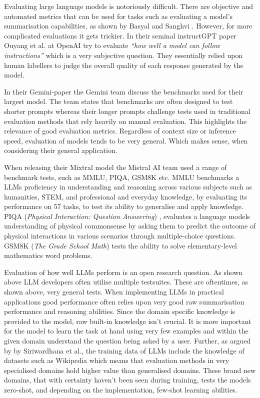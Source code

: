Evaluating large language models is notoriously difficult. There are objective and automated metrics that can be used for tasks such as evaluating a model's summarisation capabilities, as shown by Basyal and Sanghvi \cite{basyal_text_2023}. However, for more complicated evaluations it gets trickier. In their seminal instructGPT paper Ouyang et al. at OpenAI try to evaluate \textit{“how well a model can follow instructions”} \cite{ouyang_training_2022} which is a very subjective question. They essentially relied upon human labellers to judge the overall quality of each response generated by the model.


In their Gemini-paper the Gemini team discuss the benchmarks used for their largest model. The team states that benchmarks are often designed to test shorter prompts whereas their longer prompts challenge tests used in traditional evaluation methods that rely heavily on manual evaluation. This highlights the relevance of good evaluation metrics. Regardless of context size or inference speed, evaluation of models tends to be very general. Which makes sense, when considering their general application.


When releasing their Mixtral model \cite{jiang_mixtral_2024} the Mistral AI team used a range of benchmark tests, such as MMLU, PIQA, GSM8K etc. \gls{MMLU} \cite{hendrycks_measuring_2021} benchmarks a \gls{LLM}s proficiency in understanding and reasoning across various subjects such as humanities, STEM, and professional and everyday knowledge, by evaluating its performance on 57 tasks, to test its ability to generalise and apply knowledge. PIQA (\textit{Physical Interaction: Question Answering}) \cite{bisk_piqa_2019}, evaluates a language models understanding of physical commonsense by asking them to predict the outcome of physical interactions in various scenarios through multiple-choice questions. GSM8K (\textit{The Grade School Math}) \cite{cobbe_training_2021} tests the ability to solve elementary-level mathematics word problems.


Evaluation of how well \gls{LLM}s perform is an open research question. As shown above \gls{LLM} developers often utilise multiple testsuites. These are oftentimes, as shown above, very general tests. When implementing \gls{LLM}s in practical applications good performance often relies upon very good raw summarisation performance and reasoning abilities. Since the domain specific knowledge is provided to the model, raw built-in knowledge isn’t crucial. It is more important for the model to learn the task at hand using very few examples and within the given domain understand the question being asked by a user.
Further, as argued by by Siriwardhana et al., the training data of \gls{LLM}s include the knowledge of datasets such as Wikipedia \cite{siriwardhana_improving_2023} which means that evaluation methods in very specialised domains hold higher value than generalised domains. These brand new domains, that with certainty haven't been seen during training, tests the models zero-shot, and depending on the implementation, few-shot learning abilities.


